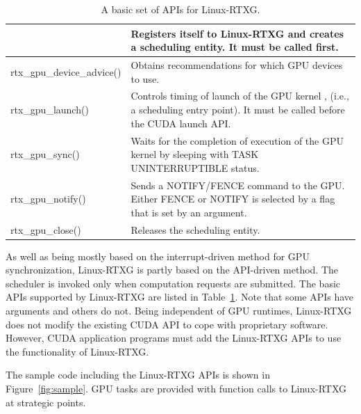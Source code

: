 \begin{table}[!t]
\begin{center}
\caption{A basic set of APIs for Linux-RTXG.}
\label{tab:rtx-api}
\ifthesis
\begin{tabular}{|l|p{25em}|} \hline
\else
\begin{tabular}{|l|p{53em}|} \hline
\fi
rtx\_gpu\_open() & Registers itself to Linux-RTXG and creates a scheduling entity. It must be called first. \\ \hline
rtx\_gpu\_device\_advice() & Obtains recommendations for which GPU devices to use. \\ \hline
rtx\_gpu\_launch() & Controls timing of launch of the GPU kernel , (i.e., a scheduling entry point). It must be called before the CUDA launch API. \\ \hline
rtx\_gpu\_sync() & Waits for the completion of execution of the GPU kernel by sleeping with TASK UNINTERRUPTIBLE status. \\ \hline
rtx\_gpu\_notify() & Sends a NOTIFY/FENCE command to the GPU. Either FENCE or NOTIFY is selected by a flag that is set by an argument.\\ \hline
rtx\_gpu\_close() & Releases the scheduling entity.\\ \hline
\end{tabular}
\end{center}
\vspace{-4mm}
\end{table}

As well as being mostly based on the interrupt-driven method for GPU synchronization, Linux-RTXG is partly based on the API-driven method.
The scheduler is invoked only when computation requests are submitted.
The basic APIs supported by Linux-RTXG are listed in Table~\ref{tab:rtx-api}.
Note that some APIs have arguments and others do not.
Being independent of GPU runtimes, Linux-RTXG does not modify the existing CUDA API to cope with proprietary software.
However, CUDA application programs must add the Linux-RTXG APIs to use the functionality of Linux-RTXG.


The sample code including the Linux-RTXG APIs is shown in Figure~\ref{fig:sample}.
GPU tasks are provided with function calls to Linux-RTXG at strategic points.


